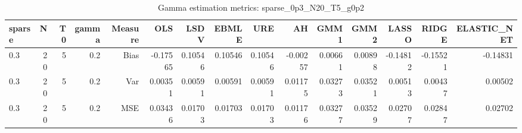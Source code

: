 \begin{table}[!htbp]\centering
\caption{Gamma estimation metrics: sparse_0p3_N20_T5_g0p2}
\label{tab:table1_sparse_0p3_N20_T5_g0p2}
\begin{tabular}{lrrrrrrrrrrrrrr}
\hline
sparse & N & T0 & gamma & Measure & OLS & LSDV & EBMLE & URE & AH & GMM1 & GMM2 & LASSO & RIDGE & ELASTIC_NET \\
\hline
0.3 & 20 & 5 & 0.2 & Bias & -0.17565 & 0.10546 & 0.10546 & 0.10546 & -0.00257 & 0.00661 & 0.00898 & -0.14812 & -0.15521 & -0.14831 \\
0.3 & 20 & 5 & 0.2 & Var & 0.00351 & 0.00591 & 0.00591 & 0.00591 & 0.01175 & 0.03273 & 0.03521 & 0.00513 & 0.00437 & 0.00502 \\
0.3 & 20 & 5 & 0.2 & MSE & 0.03436 & 0.01703 & 0.01703 & 0.01703 & 0.01176 & 0.03277 & 0.03529 & 0.02707 & 0.02847 & 0.02702 \\
\hline
\end{tabular}
\end{table}


